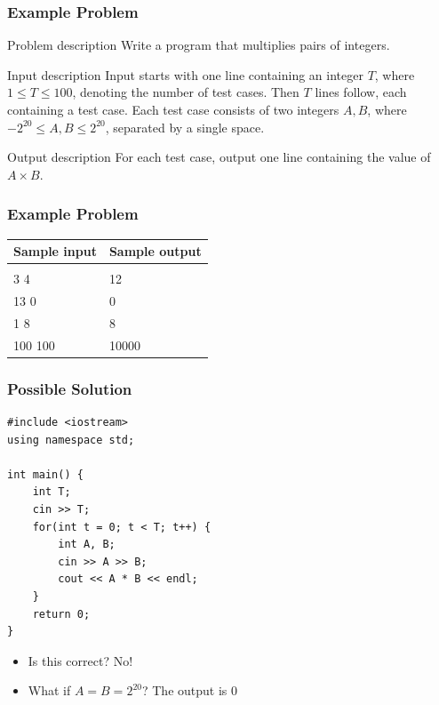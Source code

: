 \documentclass{beamer}
\begin{document}
\begin{frame}[plain]
	\frametitle{Example Problem}
	\begin{block}{Problem description}
    		Write a program that multiplies pairs of integers.
    \end{block}

    \vspace{10pt}
    
    \begin{block}{Input description}
    		Input starts with one line containing an integer $T$, where $1\leq T \leq
    100$, denoting the number of test cases. Then $T$ lines follow, each
    containing a test case. Each test case consists of two integers $A,B$,
    where $-2^{20} \leq A,B \leq 2^{20}$, separated by a single space.
    \end{block}

    \vspace{10pt}
    
    \begin{block}{Output description}
    		For each test case, output one line containing the value of $A\times B$.
    \end{block}
\end{frame}

\begin{frame}[plain]
	\frametitle{Example Problem}
	\begin{center}
		\begin{tabular}{|l|l|}
            \hline
            {\footnotesize Sample input} & {\footnotesize Sample output} \\
            \hline
            \ttfamily
            4 &  \\
            3 4 & 12 \\
            13 0 & 0 \\
            1 8 & 8 \\
            100 100 & 10000 \\
            \hline
        \end{tabular}
    \end{center}
\end{frame}

\begin{frame}
    \frametitle{Possible Solution}
	\begin{scriptsize}
        \begin{verbatim}
#include <iostream>
using namespace std;

int main() {
    int T;
    cin >> T;
    for(int t = 0; t < T; t++) {
        int A, B;
        cin >> A >> B;
        cout << A * B << endl;
    }
    return 0;
}
        \end{verbatim}
    \end{scriptsize}
    \begin{itemize}
        \item<2-> Is this correct?  {\alert{No!}}
        \item<3-> What if $A = B = 2^{20}$?  {The output is $0$ }
    \end{itemize}
\end{frame}
\end{document}
